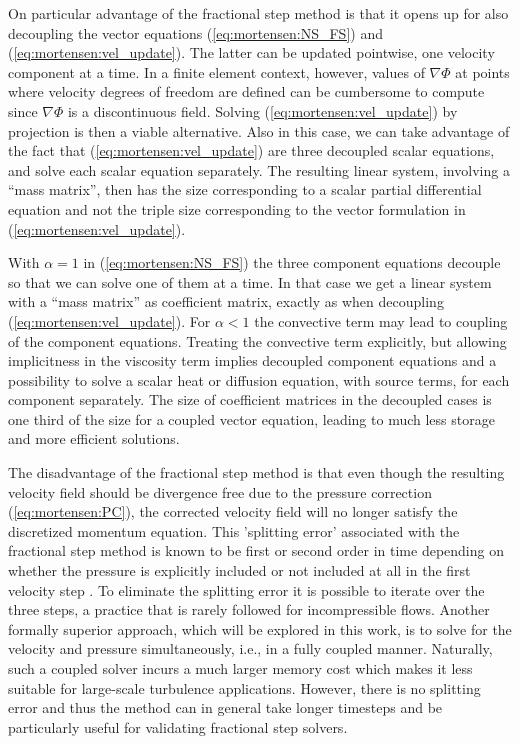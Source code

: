 On particular advantage of the fractional step method is that it opens
up for also decoupling the vector equations (\eqref{eq:mortensen:NS_FS})
and (\eqref{eq:mortensen:vel_update}). The latter can be updated pointwise,
one velocity component at a time. In a finite element context, however,
values of $\nabla\Phi$ at points where velocity degrees of freedom
are defined can be cumbersome to compute since $\nabla\Phi$ is
a discontinuous field. Solving (\eqref{eq:mortensen:vel_update}) by projection
is then a viable alternative. Also in this case, we can take advantage
of the fact that (\eqref{eq:mortensen:vel_update}) are three decoupled
scalar equations, and solve each scalar equation separately.
The resulting linear system, involving a ``mass matrix'', then has the size 
corresponding to a scalar partial differential equation and not the
triple size corresponding to the vector formulation in (\eqref{eq:mortensen:vel_update}).

With $\alpha =1$ in (\eqref{eq:mortensen:NS_FS}) the three component equations
decouple so that we can solve one of them at a time. In that case
we get a linear system with a ``mass matrix'' as coefficient matrix,
exactly as when decoupling (\eqref{eq:mortensen:vel_update}).
For $\alpha <1$ the convective term may lead to coupling of the
component equations. Treating the convective term explicitly, but
allowing implicitness in the viscosity term implies decoupled
component equations and a possibility to solve a scalar heat or 
diffusion equation, with source terms, for each component separately.
The size of coefficient matrices in the decoupled cases is one third
of the size for a coupled vector equation, leading to much less
storage and more efficient solutions.


The disadvantage of the fractional step method is
that even though the resulting velocity field should be divergence
free due to the pressure correction (\eqref{eq:mortensen:PC}), 
the corrected velocity field will
no longer satisfy the discretized momentum equation. This 'splitting
error' associated with the fractional step method is known to be first
or second order in time depending on whether the pressure is
explicitly included or not included at all in the first velocity
step \cite{guemin}. To eliminate the splitting error it is possible to iterate over
the three steps, a practice that is rarely followed for incompressible
flows. Another formally superior approach, which will be explored in
this work, is to solve for the velocity and pressure
simultaneously, i.e., in a fully coupled manner. 
Naturally, such a coupled solver incurs a much larger
memory cost which makes it  less suitable for large-scale turbulence
applications. However, there is no splitting error and thus the method
can in general take longer timesteps and be particularly useful for
validating fractional step solvers.

